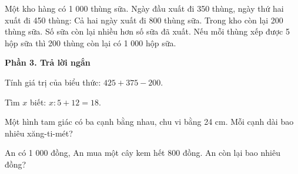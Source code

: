 \begin{ex} %
Một kho hàng có 1 000 thùng sữa. Ngày đầu xuất đi 350 thùng, ngày thứ hai xuất đi 450 thùng:
\choiceTF
{\True Cả hai ngày xuất đi 800 thùng sữa.}
{\True Trong kho còn lại 200 thùng sữa.}
{Số sữa còn lại nhiều hơn số sữa đã xuất.}
{\True Nếu mỗi thùng xếp được 5 hộp sữa thì 200 thùng còn lại có 1 000 hộp sữa.}
\end{ex}

\textbf{Phần 3. Trả lời ngắn}

\begin{ex} %
Tính giá trị của biểu thức: $425 + 375 - 200$.
\end{ex}

\begin{ex} %
Tìm $x$ biết: $x : 5 + 12 = 18$.
\end{ex}

\begin{ex} %
Một hình tam giác có ba cạnh bằng nhau, chu vi bằng 24 cm. Mỗi cạnh dài bao nhiêu xăng-ti-mét?
\end{ex}

\begin{ex} %
An có 1 000 đồng, An mua một cây kem hết 800 đồng. An còn lại bao nhiêu đồng?
\end{ex}

